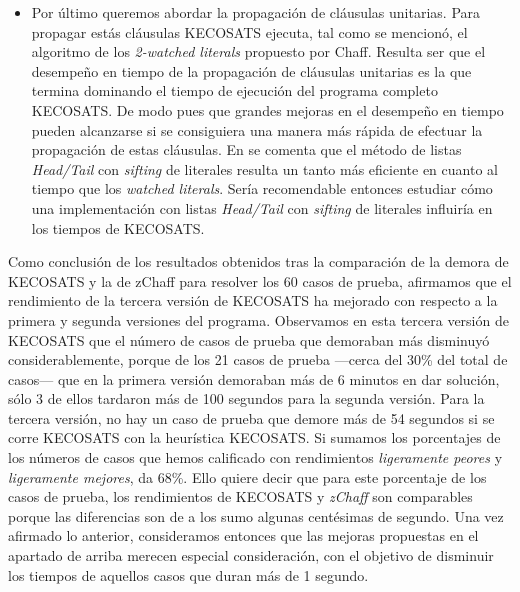 \documentclass[12pt,lettersize,oneside]{article}
\begin{document}
\begin{itemize}
\item Por último queremos abordar la propagación de cláusulas unitarias. Para
  propagar estás cláusulas KECOSATS ejecuta, tal como se mencionó, el algoritmo
  de los \emph{2-watched literals} propuesto por Chaff. Resulta ser que el
  desempeño en tiempo de la propagación de cláusulas unitarias es la que termina
  dominando el tiempo de ejecución del programa completo KECOSATS. De modo pues
  que grandes mejoras en el desempeño en tiempo pueden alcanzarse si se
  consiguiera una manera más rápida de efectuar la propagación de estas
  cláusulas. En \cite{Marques} se comenta que el método de listas
  \emph{Head/Tail} con \emph{sifting} de literales resulta un tanto más
  eficiente en cuanto al tiempo que los \emph{watched literals}. Sería
  recomendable entonces estudiar cómo una implementación con listas
  \emph{Head/Tail} con \emph{sifting} de literales influiría en los tiempos de
  KECOSATS.
\end{itemize}

Como conclusión de los resultados obtenidos tras la comparación de la demora de
KECOSATS y la de zChaff para resolver los 60 casos de prueba, afirmamos que el
rendimiento de la tercera versión de KECOSATS ha mejorado con respecto a la
primera y segunda versiones del programa. Observamos en esta tercera versión de
KECOSATS que el número de casos de prueba que demoraban más disminuyó
considerablemente, porque de los 21 casos de prueba ---cerca del 30\% del total
de casos--- que en la primera versión demoraban más de 6 minutos en dar
solución, sólo 3 de ellos tardaron más de 100 segundos para la segunda
versión. Para la tercera versión, no hay un caso de prueba que demore más de 54
segundos si se corre KECOSATS con la heurística KECOSATS. Si sumamos los
porcentajes de los números de casos que hemos calificado con rendimientos
\emph{ligeramente peores} y \emph{ligeramente mejores}, da 68\%. Ello quiere
decir que para este porcentaje de los casos de prueba, los rendimientos de
KECOSATS y \emph{zChaff} son comparables porque las diferencias son de a los
sumo algunas centésimas de segundo.  Una vez afirmado lo anterior, consideramos
entonces que las mejoras propuestas en el apartado de arriba merecen especial
consideración, con el objetivo de disminuir los tiempos de aquellos casos que
duran más de 1 segundo.
\end{document}

